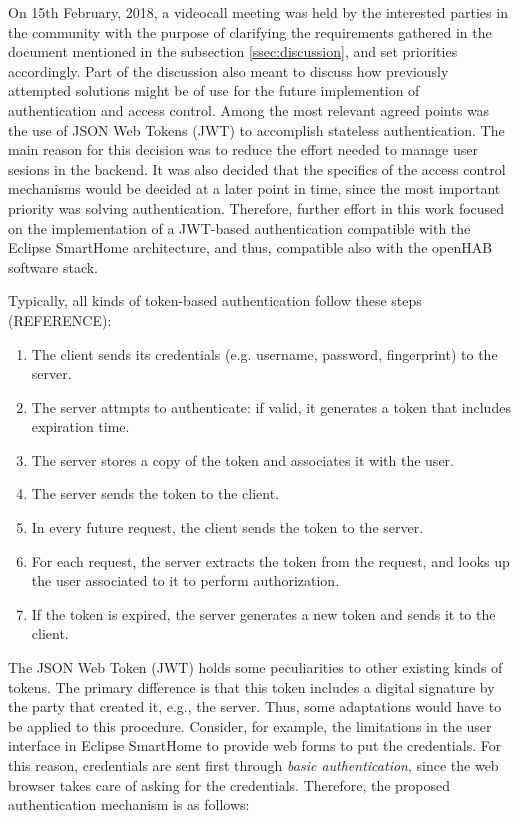 \documentclass[12pt]{article}
\newcommand{\TODO}{\todo[inline]}
\begin{document}
On 15th February, 2018, a videocall meeting was held by the interested parties in the community with the purpose of clarifying the requirements gathered in the document mentioned in the subsection \ref{ssec:discussion}, and set priorities accordingly. Part of the discussion also meant to discuss how previously attempted solutions might be of use for the future implemention of authentication and access control. Among the most relevant agreed points was the use of JSON Web Tokens (JWT) to accomplish stateless authentication. The main reason for this decision was to reduce the effort needed to manage user sesions in the backend. It was also decided that the specifics of the access control mechanisms would be decided at a later point in time, since the most important priority was solving authentication. Therefore, further effort in this work focused on the implementation of a JWT-based authentication compatible with the Eclipse SmartHome architecture, and thus, compatible also with the openHAB software stack.

Typically, all kinds of token-based authentication follow these steps (REFERENCE):
\TODO{Structure as an algorithm}
\begin{enumerate}
\item The client sends its credentials (e.g. username, password, fingerprint) to the server.
\item The server attmpts to authenticate: if valid, it generates a token that includes expiration time.
\item The server stores a copy of the token and associates it with the user.
\item The server sends the token to the client.
\item In every future request, the client sends the token to the server.
\item For each request, the server extracts the token from the request, and looks up the user associated to it to perform authorization.
\item If the token is expired, the server generates a new token and sends it to the client. 
\end{enumerate}

The JSON Web Token (JWT) holds some peculiarities to other existing kinds of tokens. The primary difference is that this token includes a digital signature by the party that created it, e.g., the server. Thus, some adaptations would have to be applied to this procedure. Consider, for example, the limitations in the user interface in Eclipse SmartHome to provide web forms to put the credentials. For this reason, credentials are sent first through \emph{basic authentication}, since the web browser takes care of asking for the credentials. Therefore, the proposed authentication mechanism is as follows:
\end{document}
